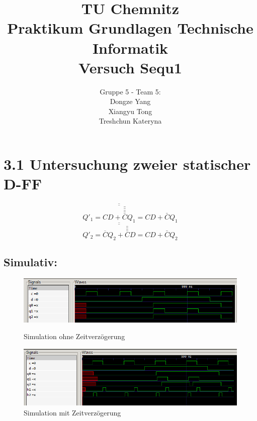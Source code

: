 \documentclass[fleqn]{article}
\title{TU Chemnitz \\ Praktikum Grundlagen Technische Informatik \\ Versuch Sequ1}
\author{Gruppe 5 - Team 5: \\ Dongze Yang \\Xiangyu Tong \\ Treshchun Kateryna}
\begin{document}
\maketitle



\pagestyle{main}

\section{3.1 Untersuchung zweier statischer D-FF}

$$Q'_1 = \overline{\overline{CD + \bar{\bar{\bar{\bar{\bar{C}}}}}Q_1}} = CD+\bar{C}Q_1$$
$$Q'_2 = \overline{\overline{\overline{C}Q_2+\bar{\bar{\bar{\bar{C}}}}D}} = CD + \bar{C}Q_2$$




\subsection{Simulativ:}

\begin{figure}[!hb]
    \centering\includegraphics[width=6in]{ohne.png}
    \caption{Simulation ohne Zeitverzögerung}

    \centering\includegraphics[width=6in]{mit.png}
    \caption{Simulation mit Zeitverzögerung}
\end{figure}
\end{document}
